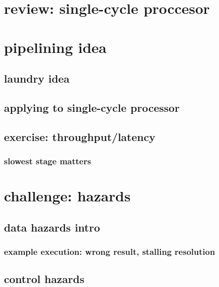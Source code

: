 
\section{review: single-cycle proccesor}



\section{pipelining idea}

\subsection{laundry idea}



\subsection{applying to single-cycle processor}


\subsection{exercise: throughput/latency}


\subsubsection{slowest stage matters}





\section{challenge: hazards}

\subsection{data hazards intro}

\subsubsection{example execution: wrong result, stalling resolution}


\subsection{control hazards}

